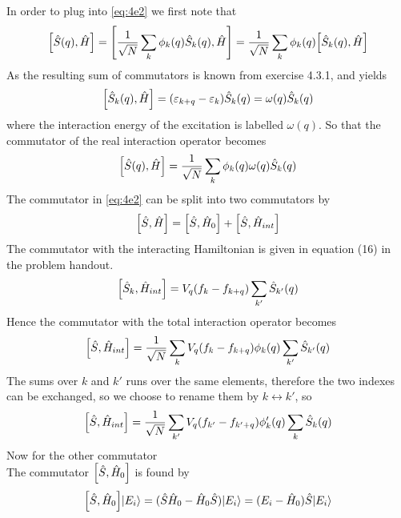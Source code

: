 \begin{solution}
In order to plug into \eqref{eq:4e2} we first note that 
\begin{equation}
    \comm{\hat{S}(q)}{\hat{H}} = \comm{\dfrac{1}{\sqrt{N}}\sum_k \phi_k(q)\hat{S}_k(q)}{\hat{H}} = \dfrac{1}{\sqrt{N}}\sum_k\phi_{k}(q) \comm{\hat{S}_k(q)}{\hat{H}}
\end{equation}
As the resulting sum of commutators is known from exercise 4.3.1, and yields 
\begin{equation}
    \comm{\hat{S}_k(q)}{\hat{H}} = (\varepsilon_{k+q}-\varepsilon_{k})\hat{S}_{k}(q)=\omega(q)\hat{S}_{k}(q)
\end{equation}
where the interaction energy of the excitation is labelled $\omega(q)$. So that the commutator of the real interaction operator becomes
\begin{equation}\label{eq:421}
    \comm{\hat{S}(q)}{\hat{H}} = \dfrac{1}{\sqrt{N}}\sum_k\phi_{k}(q) \omega(q)\hat{S}_k(q)
\end{equation}
The commutator in \eqref{eq:4e2} can be split into two commutators by
\begin{equation}\label{eq:422}
    \comm{\hat{S}}{\hat{H}} = \comm{\hat{S}}{\hat{H}_0} + \comm{\hat{S}}{\hat{H}_{int}}
\end{equation}
The commutator with the interacting Hamiltonian is given in equation (16) in the problem handout.
\begin{equation}
    \comm{\hat{S}_{k}}{\hat{H}_{int}} = V_q (f_k - f_{k+q}) \sum_{k'} \hat{S}_{k'}(q)
\end{equation}
Hence the commutator with the total interaction operator becomes
\begin{equation}\label{eq:424}
    \comm{\hat{S}}{\hat{H}_{int}} = \dfrac{1}{\sqrt{N}}\sum_{k} V_q (f_k - f_{k+q}) \phi_k(q) \sum_{k'} \hat{S}_{k'}(q)
\end{equation}
The sums over $k$ and $k'$ runs over the same elements, therefore the two indexes can be exchanged, so we choose to rename them by $k \leftrightarrow k'$, so
\begin{equation}\label{eq:425}
    \comm{\hat{S}}{\hat{H}_{int}} = \dfrac{1}{\sqrt{N}}\sum_{k'} V_q (f_{k'} - f_{k'+q}) \phi_k'(q) \sum_{k} \hat{S}_{k}(q)
\end{equation}
Now for the other commutator \\
The commutator $\comm{\hat{S}}{\hat{H}_0}$ is found by
\begin{equation}
    \comm{\hat{S}}{\hat{H}_0}\ket{E_i} = (\hat{S} \hat{H}_0-\hat{H}_0 \hat{S}) \ket{E_i} = (E_i - \hat{H}_0) \hat{S} \ket{E_i} 

\end{equation}
\end{solution}
